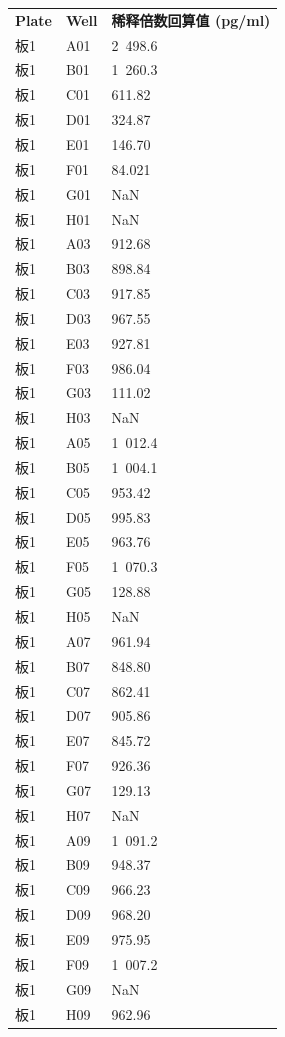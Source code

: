 \documentclass[UTF8,10pt,a4paper,fontset=fandol]{ctexart}
\begin{document}
\begin{tabular}{lll}
\textbf{Plate} & \textbf{Well} & \textbf{稀释倍数回算值 (pg/ml)} \\
板1 & A01 & 2\ 498.6 \\
板1 & B01 & 1\ 260.3 \\
板1 & C01 & 611.82 \\
板1 & D01 & 324.87 \\
板1 & E01 & 146.70 \\
板1 & F01 & 84.021 \\
板1 & G01 & NaN \\
板1 & H01 & NaN \\
板1 & A03 & 912.68 \\
板1 & B03 & 898.84 \\
板1 & C03 & 917.85 \\
板1 & D03 & 967.55 \\
板1 & E03 & 927.81 \\
板1 & F03 & 986.04 \\
板1 & G03 & 111.02 \\
板1 & H03 & NaN \\
板1 & A05 & 1\ 012.4 \\
板1 & B05 & 1\ 004.1 \\
板1 & C05 & 953.42 \\
板1 & D05 & 995.83 \\
板1 & E05 & 963.76 \\
板1 & F05 & 1\ 070.3 \\
板1 & G05 & 128.88 \\
板1 & H05 & NaN \\
板1 & A07 & 961.94 \\
板1 & B07 & 848.80 \\
板1 & C07 & 862.41 \\
板1 & D07 & 905.86 \\
板1 & E07 & 845.72 \\
板1 & F07 & 926.36 \\
板1 & G07 & 129.13 \\
板1 & H07 & NaN \\
板1 & A09 & 1\ 091.2 \\
板1 & B09 & 948.37 \\
板1 & C09 & 966.23 \\
板1 & D09 & 968.20 \\
板1 & E09 & 975.95 \\
板1 & F09 & 1\ 007.2 \\
板1 & G09 & NaN \\
板1 & H09 & 962.96
\end{tabular}
\end{document}
